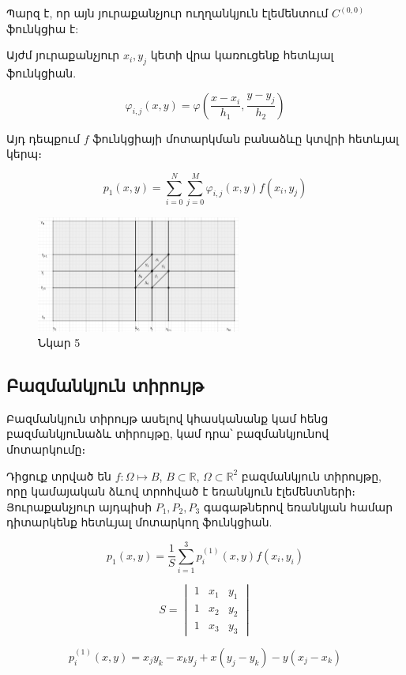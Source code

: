 \documentclass[fleqn, bachelor,subf,12pt,notitlepage]{disser}
\begin{document}
\noindent Պարզ է, որ այն յուրաքանչյուր ուղղանկյուն էլեմենտում $C^{(0, 0)}$ ֆունկցիա է:

\noindent  Այժմ յուրաքանչյուր $x_{i}, y_{j}$ կետի վրա կառուցենք հետևյալ ֆունկցիան.

$$\varphi_{i,j}(x,y)=\varphi \left(\dfrac{x-x_{i}}{h_{1}}, \dfrac{y-y_{j}}{h_{2}}\right)$$

\newpage

Այդ դեպքում $f$ ֆունկցիայի մոտարկման բանաձևը կտվրի հետևյալ կերպ։

$$p_{1}(x,y)=\sum_{i=0}^{N}\sum_{j=0}^{M}\varphi_{i,j}(x,y)f(x_{i}, y_{j})$$

\begin{figure}[h!]
\centering
\includegraphics[width=0.6\textwidth]{images/image_5}
\captionsetup{labelformat=empty}
\caption{\hfill Նկար 5}
\end{figure}

\newpage

\subsection*{Բազմանկյուն տիրույթ}

Բազմանկյուն տիրույթ ասելով կհասկանանք կամ հենց բազմանկյունաձև տիրույթը, կամ դրա՝ բազմանկյունով մոտարկումը։ 

Դիցուք տրված են $f:\Omega\mapsto B$,  $B \subset \mathbb{R}$, $\Omega \subset \mathbb{R}^{2} $ բազմանկյուն տիրույթը, որը կամայական ձևով տրոհված է եռանկյուն էլեմենտների։ Յուրաքանչյուր այդպիսի $P_{1}, P_{2}, P_{3}$ գագաթներով եռանկյան համար դիտարկենք հետևյալ մոտարկող ֆունկցիան.

$$p_{1}(x, y) = \dfrac{1}{S}\sum_{i=1}^{3} p^{(1)}_{i}(x,y)f(x_{i}, y_{i})$$

$$S = \begin{vmatrix}
     1 & x_1 & y_1\\ 
     1 & x_2 & y_2\\
     1 & x_3 & y_3 
\end{vmatrix}$$

$$p^{(1)}_{i}(x,y) = x_{j}y_{k}-x_{k}y_{j}+x(y_{j}-y_{k})-y(x_{j}-x_{k})$$
\end{document}
